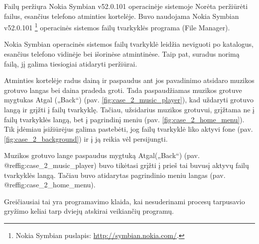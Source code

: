 \begin{xcase}{Failų peržiųra Nokia Symbian v52.0.101 operacinėje sistemoje}
  \xcgoal
  {
    Norėta peržiūrėti failus, esančius telefono atminties kortelėje. 
    Buvo naudojama Nokia Symbian v52.0.101 \footnote{Nokia Symbian puslapis: \url{http://symbian.nokia.com/}.} 
    operacinės sistemos failų tvarkyklės programa (File Manager). 
  }
  
  \xctools
  {
    Nokia Symbian operacinės sistemos failų tvarkyklė leidžia neviguoti po
	katalogus, esančius telefono vidinėje bei išorinėse atmintinėse. Taip 
	pat, suradus norimą failą, jį galima tiesiogiai atidaryti peržiūrai.
  }
  
  \xcresult
  {
    Atminties kortelėje radus dainą ir paspaudus ant jos pavadinimo atsidaro muzikos
    grotuvo langas bei daina pradeda groti. Tada paspaudžiamas muzikos grotuve mygtukas 
    Atgal („Back“) (pav. \ref{fig:case_2_music_player}), kad uždaryti grotuvo langą 
    ir grįžti į failų tvarkyklę. Tačiau, užsidarius muzikos grotuvui, grįžtama ne į
    failų tvarkyklės langą, bet į pagrindinį meniu (pav. \ref{fig:case_2_home_menu}). 
    Tik įdėmiau įsižiūrėjus galima pastebėti, jog failų tvarkyklė liko aktyvi fone 
    (pav. \ref{fig:case_2_background}) ir į ją reikia vėl persijungti.
	
    {
    }
  }
  
  \xcprinciples
  {
    {
      Muzikos grotuvo lange paspaudus mygtuką Atgal(„Back“) (pav. @ref{fig:case_2_music_player}) buvo tikėtasi grįžti 
      į prieš tai buvusį aktyvų failų tvarkyklės langą. Tačiau buvo atidarytas 
      pagrindinio meniu langas (pav. @ref{fig:case_2_home_menu}).
    }
  }
  
  \xcthoughts
  {
    Greičiausiai tai yra programavimo klaida, kai nesuderinami procesų tarpusavio gryžimo keliai
    tarp dviejų atskirai veikiančių programų.
  }
\end{xcase}
